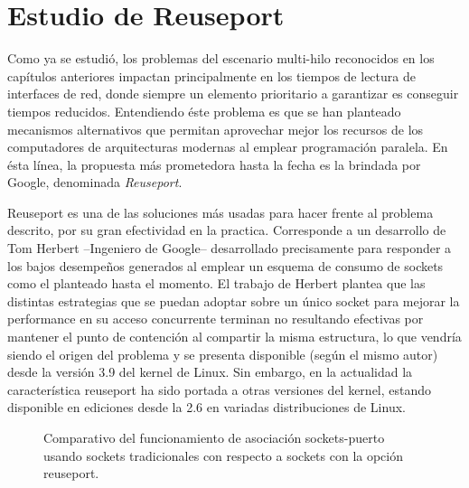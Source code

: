 \chapter{Estudio de Reuseport}

Como ya se estudió, los problemas del escenario multi-hilo reconocidos en los capítulos anteriores impactan principalmente en los tiempos de lectura de interfaces de red, donde siempre un elemento prioritario a garantizar es conseguir tiempos reducidos. Entendiendo éste problema es que se han planteado mecanismos alternativos que permitan aprovechar mejor los recursos de los computadores de arquitecturas modernas al emplear programación paralela. En ésta línea, la propuesta más prometedora hasta la fecha es la brindada por Google, denominada \emph{Reuseport}.

Reuseport \cite{slides:googleReuseport} es una de las soluciones más usadas para hacer frente al problema descrito, por su gran efectividad en la practica. Corresponde a un desarrollo de Tom Herbert --Ingeniero de Google-- desarrollado precisamente para responder a los bajos desempeños generados al emplear un esquema de consumo de sockets como el planteado hasta el momento. El trabajo de Herbert plantea que las distintas estrategias que se puedan adoptar sobre un único socket para mejorar la performance en su acceso concurrente terminan no resultando efectivas por mantener el punto de contención al compartir la misma estructura, lo que vendría siendo el origen del problema y se presenta disponible (según el mismo autor) desde la versión 3.9 del kernel de Linux. Sin embargo, en la actualidad la característica reuseport ha sido portada a otras versiones del kernel, estando disponible en ediciones desde la 2.6 en variadas distribuciones de Linux.

\begin{figure}[h!]
	\centering
	\hspace*{\fill}
	\hfill
	\caption{Comparativo del funcionamiento de asociación sockets-puerto usando sockets tradicionales con respecto a sockets con la opción reuseport.}
	\label{fig:socketHandshake}
	\hspace*{\fill}
\end{figure}


